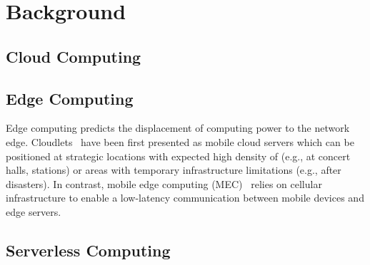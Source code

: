 \section{Background}\label{sec:background}

\subsection{Cloud Computing}



\subsection{Edge Computing}

Edge computing predicts the displacement of computing power to the network edge. Cloudlets~\cite{CLOUDLETS} have been first presented as mobile cloud servers which can be positioned at strategic locations with expected high density of (e.g., at concert halls, stations) or areas with temporary infrastructure limitations (e.g., after disasters). In contrast, mobile edge computing (MEC)~\cite{MEC} relies on cellular infrastructure to enable a low-latency communication between mobile devices and edge servers. 

\subsection{Serverless Computing}

